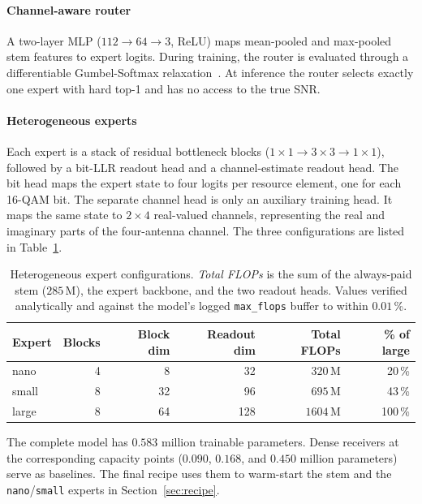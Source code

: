 \paragraph{Channel-aware router}
A two-layer MLP ($112 \to 64 \to 3$, ReLU) maps mean-pooled and max-pooled stem features to expert logits. During training, the router is evaluated through a differentiable Gumbel-Softmax relaxation~\cite{jang2017gumbel}. At inference the router selects exactly one expert with hard top-1 and has no access to the true SNR.

\paragraph{Heterogeneous experts}
Each expert is a stack of residual bottleneck blocks ($1{\times}1 \to 3{\times}3 \to 1{\times}1$), followed by a bit-LLR readout head and a channel-estimate readout head. The bit head maps the expert state to four logits per resource element, one for each 16-QAM bit. The separate channel head is only an auxiliary training head. It maps the same state to $2 \times 4$ real-valued channels, representing the real and imaginary parts of the four-antenna channel. The three configurations are listed in Table~\ref{tab:experts}.

\begin{table}[h]
\centering
\small
\setlength{\tabcolsep}{6pt}
\begin{tabular}{l r r r r r}
\toprule
Expert & Blocks & Block dim & Readout dim & Total FLOPs & \% of large \\
\midrule
nano  & 4 &  8 &  32 & $320$\,M &  20\,\% \\
small & 8 & 32 &  96 & $695$\,M &  43\,\% \\
large & 8 & 64 & 128 & $1604$\,M & 100\,\% \\
\bottomrule
\end{tabular}
\caption{Heterogeneous expert configurations. \emph{Total FLOPs} is the sum of the always-paid stem ($285$\,M), the expert backbone, and the two readout heads. Values verified analytically and against the model's logged \texttt{max\_flops} buffer to within $0.01$\,\%.}
\label{tab:experts}
\end{table}

The complete model has $\num{0.583}$ million trainable parameters. Dense receivers at the corresponding capacity points ($\num{0.090}$, $\num{0.168}$, and $\num{0.450}$ million parameters) serve as baselines. The final recipe uses them to warm-start the stem and the \texttt{nano}/\texttt{small} experts in Section~\ref{sec:recipe}.

